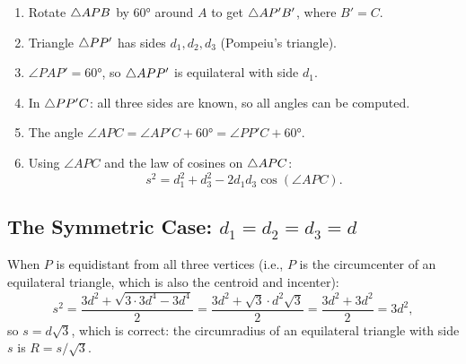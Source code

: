 \begin{enumerate}
    \item Rotate $\triangle APB$ by $60°$ around $A$ to get $\triangle AP'B'$, where $B' = C$.
    \item Triangle $\triangle PP'$ has sides $d_1, d_2, d_3$ (Pompeiu's triangle).
    \item $\angle PAP' = 60°$, so $\triangle APP'$ is equilateral with side $d_1$.
    \item In $\triangle PP'C$: all three sides are known, so all angles can be computed.
    \item The angle $\angle APC = \angle AP'C + 60° = \angle PP'C + 60°$.
    \item Using $\angle APC$ and the law of cosines on $\triangle APC$:
    \begin{equation}
    s^2 = d_1^2 + d_3^2 - 2d_1 d_3 \cos(\angle APC).
    \end{equation}
\end{enumerate}

\subsection{The Symmetric Case: $d_1 = d_2 = d_3 = d$}

When $P$ is equidistant from all three vertices (i.e., $P$ is the circumcenter of an equilateral triangle, which is also the centroid and incenter):
\begin{equation}
s^2 = \frac{3d^2 + \sqrt{3 \cdot 3d^4 - 3d^4}}{2} = \frac{3d^2 + \sqrt{3} \cdot d^2\sqrt{3}}{2} = \frac{3d^2 + 3d^2}{2} = 3d^2,
\end{equation}
so $s = d\sqrt{3}$, which is correct: the circumradius of an equilateral triangle with side $s$ is $R = s/\sqrt{3}$.
